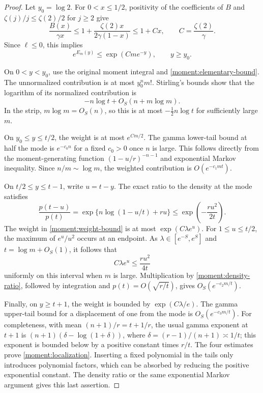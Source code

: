 \begin{proof}
Let $y_0=\log2$. For $0<x\le1/2$, positivity of the coefficients of $B$
and $\zeta(j)/j\le\zeta(2)/2$ for $j\ge2$ give
\[
 \frac{B(x)}{\gamma x}
 \le1+\frac{\zeta(2)x}{2\gamma(1-x)}
 \le1+C x,\qquad C=\frac{\zeta(2)}\gamma.
\]
Since $\ell\le0$, this implies
\begin{equation}\label{moment:weight-bound}
 e^{E_m(y)}\le \exp(Cme^{-y}),\qquad y\ge y_0.
\end{equation}

On $0<y<y_0$, use the original moment integral and
\eqref{moment:elementary-bound}. The unnormalized contribution is at most
$y_0^n m!$. Stirling's bounds show that the logarithm of its normalized
contribution is
\[
 -n\log t+O_S(n+m\log m).
\]
In the strip, $m\log m=O_S(n)$, so this is at most
$-\tfrac12n\log t$ for sufficiently large $m$.

On $y_0\le y\le t/2$, the weight is at most $e^{Cm/2}$.
The gamma lower-tail bound at half the mode is $e^{-c_0n}$ for a fixed
$c_0>0$ once $n$ is large. This follows directly from the moment-generating
function $(1-u/r)^{-n-1}$ and exponential Markov inequality.
Since $n/m\sim\log m$, the weighted contribution is $O(e^{-c_1mt})$.

On $t/2\le y\le t-1$, write $u=t-y$. The exact ratio to the density at
the mode satisfies
\begin{equation}\label{moment:density-ratio}
 \frac{p(t-u)}{p(t)}
 =\exp\{n\log(1-u/t)+ru\}
 \le\exp\!\left(-\frac{ru^2}{2t}\right).
\end{equation}
The weight in \eqref{moment:weight-bound} is at most $\exp(C\lambda e^u)$.
For $1\le u\le t/2$, the maximum of $e^u/u^2$ occurs at an endpoint.
As $\lambda\in[e^{-S},e^S]$ and $t=\log m+O_S(1)$, it follows that
\[
 C\lambda e^u\le \frac{ru^2}{4t}
\]
uniformly on this interval when $m$ is large. Multiplication by
\eqref{moment:density-ratio}, followed by integration and
$p(t)=O(\sqrt{r/t})$, gives $O_S(e^{-c_2m/t})$.

Finally, on $y\ge t+1$, the weight is bounded by $\exp(C\lambda/e)$.
The gamma upper-tail bound for a displacement of one from the mode is
$O_S(e^{-c_3m/t})$. For completeness, with mean $(n+1)/r=t+1/r$,
the usual gamma exponent at $t+1$ is
$(n+1)(\delta-\log(1+\delta))$, where
$\delta=(r-1)/(n+1)\asymp1/t$; this exponent is bounded below by a
positive constant times $r/t$.
The four estimates prove \eqref{moment:localization}. Inserting a fixed
polynomial in the tails only introduces polynomial factors, which can
be absorbed by reducing the positive exponential constant. The density
ratio or the same exponential Markov argument gives this last assertion.
\end{proof}

